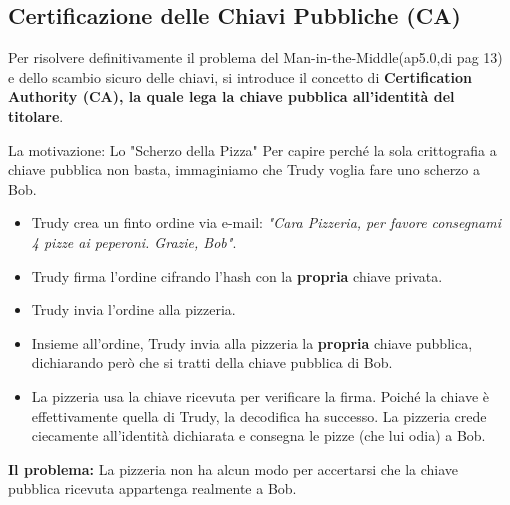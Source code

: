 \documentclass[a4paper,12pt]{report}
\begin{document}
\newpage
\subsection{Certificazione delle Chiavi Pubbliche
(CA)}
\label{subsec:cert-chiavi}
Per risolvere definitivamente il problema del Man-in-the-Middle(ap5.0,di pag 13) e dello scambio sicuro delle chiavi, si introduce il concetto di \textbf{Certification Authority (CA), la quale lega la chiave pubblica all'identit\`a del titolare}.

\begin{esempiobox}{La motivazione: Lo "Scherzo della Pizza" }
Per capire perché la sola crittografia a chiave pubblica non basta, immaginiamo che Trudy voglia fare uno scherzo a Bob.
\begin{itemize}
    \item Trudy crea un finto ordine via e-mail: \textit{"Cara Pizzeria, per favore consegnami 4 pizze ai peperoni. Grazie, Bob"}.
    \item Trudy firma l'ordine cifrando l'hash con la \textbf{propria} chiave privata.
    \item Trudy invia l'ordine alla pizzeria.
    \item Insieme all'ordine, Trudy invia alla pizzeria la \textbf{propria} chiave pubblica, dichiarando però che si tratti della chiave pubblica di Bob.
    \item La pizzeria usa la chiave ricevuta per verificare la firma. Poiché la chiave è effettivamente quella di Trudy, la decodifica ha successo. La pizzeria crede ciecamente all'identità dichiarata e consegna le pizze (che lui odia) a Bob.
\end{itemize}
\textbf{Il problema:} La pizzeria non ha alcun modo per accertarsi che la chiave pubblica ricevuta appartenga realmente a Bob.
\end{esempiobox}
\end{document}
